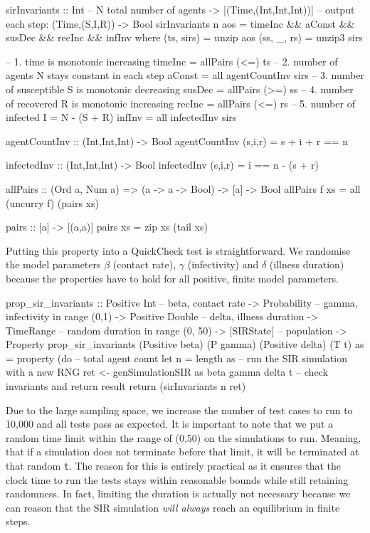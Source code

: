 \begin{HaskellCode}
sirInvariants :: Int                    -- N total number of agents
              -> [(Time,(Int,Int,Int))] -- output each step: (Time,(S,I,R))
              -> Bool
sirInvariants n aos = timeInc && aConst && susDec && recInc && infInv
  where
    (ts, sirs)  = unzip aos
    (ss, _, rs) = unzip3 sirs

    -- 1. time is monotonic increasing
    timeInc = allPairs (<=) ts
    -- 2. number of agents N stays constant in each step
    aConst = all agentCountInv sirs
    -- 3. number of susceptible S is monotonic decreasing
    susDec = allPairs (>=) ss
    -- 4. number of recovered R is monotonic increasing
    recInc = allPairs (<=) rs
    -- 5. number of infected I = N - (S + R)
    infInv = all infectedInv sirs

    agentCountInv :: (Int,Int,Int) -> Bool
    agentCountInv (s,i,r) = s + i + r == n

    infectedInv :: (Int,Int,Int) -> Bool
    infectedInv (s,i,r) = i == n - (s + r)

    allPairs :: (Ord a, Num a) => (a -> a -> Bool) -> [a] -> Bool
    allPairs f xs = all (uncurry f) (pairs xs)

    pairs :: [a] -> [(a,a)]
    pairs xs = zip xs (tail xs)
\end{HaskellCode}

Putting this property into a QuickCheck test is straightforward. We randomise the model parameters $\beta$ (contact rate), $\gamma$ (infectivity) and $\delta$ (illness duration) because the properties have to hold for all positive, finite model parameters.

\begin{HaskellCode}
prop_sir_invariants :: Positive Int    -- beta, contact rate
                    -> Probability     -- gamma, infectivity in range (0,1)
                    -> Positive Double -- delta, illness duration
                    -> TimeRange       -- random duration in range (0, 50)
                    -> [SIRState]      -- population
                    -> Property
prop_sir_invariants 
    (Positive beta) (P gamma) (Positive delta) (T t) as  = property (do
  -- total agent count
  let n = length as
  -- run the SIR simulation with a new RNG 
  ret <- genSimulationSIR as beta gamma delta t
  -- check invariants and return result
  return (sirInvariants n ret)
\end{HaskellCode}

Due to the large sampling space, we increase the number of test cases to run to 10,000 and all tests pass as expected. It is important to note that we put a random time limit within the range of (0,50) on the simulations to run. Meaning, that if a simulation does not terminate before that limit, it will be terminated at that random \texttt{t}. The reason for this is entirely practical as it ensures that the clock time to run the tests stays within reasonable bounds while still retaining randomness. In fact, limiting the duration is actually not necessary because we can reason that the SIR simulation \textit{will always} reach an equilibrium in finite steps.

